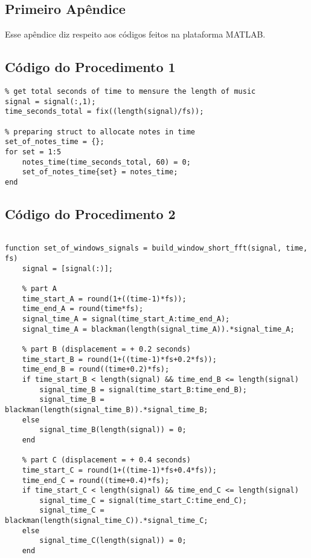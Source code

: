 \begin{apendicesenv}

\partapendices

\chapter{Primeiro Apêndice}

Esse apêndice diz respeito aos códigos feitos na plataforma MATLAB.

\section{Código do Procedimento 1}
\label{sec:codigo_procedimento_1}
\begin{lstlisting}
% get total seconds of time to mensure the length of music 
signal = signal(:,1);
time_seconds_total = fix((length(signal)/fs)); 

% preparing struct to allocate notes in time
set_of_notes_time = {};
for set = 1:5
    notes_time(time_seconds_total, 60) = 0;
    set_of_notes_time{set} = notes_time;
end
\end{lstlisting}

\section{Código do Procedimento 2}
\label{sec:codigo_procedimento_2}
\begin{lstlisting}

function set_of_windows_signals = build_window_short_fft(signal, time, fs)
	signal = [signal(:)];

    % part A
    time_start_A = round(1+((time-1)*fs));
    time_end_A = round(time*fs);
    signal_time_A = signal(time_start_A:time_end_A);
    signal_time_A = blackman(length(signal_time_A)).*signal_time_A;

    % part B (displacement = + 0.2 seconds)
    time_start_B = round(1+((time-1)*fs+0.2*fs));
    time_end_B = round((time+0.2)*fs);
    if time_start_B < length(signal) && time_end_B <= length(signal)
        signal_time_B = signal(time_start_B:time_end_B);
        signal_time_B = blackman(length(signal_time_B)).*signal_time_B;
    else
        signal_time_B(length(signal)) = 0;
    end

    % part C (displacement = + 0.4 seconds)
    time_start_C = round(1+((time-1)*fs+0.4*fs));
    time_end_C = round((time+0.4)*fs);
    if time_start_C < length(signal) && time_end_C <= length(signal)
        signal_time_C = signal(time_start_C:time_end_C);
        signal_time_C = blackman(length(signal_time_C)).*signal_time_C;
    else
        signal_time_C(length(signal)) = 0;
    end


\end{lstlisting}
\end{apendicesenv}
